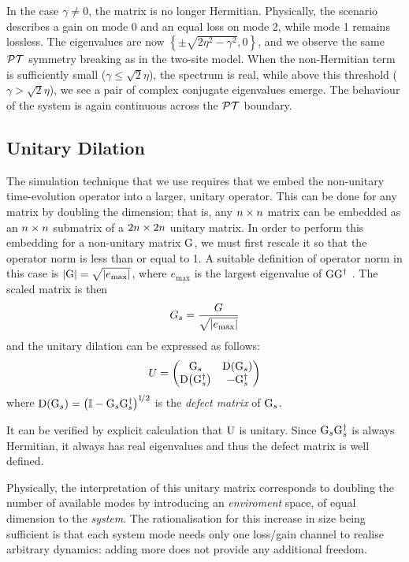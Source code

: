In the case \(\gamma \neq 0\), the matrix is no longer Hermitian. Physically,
the scenario describes a gain on mode 0 and an equal loss on mode 2, while
mode 1 remains lossless. The eigenvalues are now \(\left\{ \pm \sqrt{2 \eta^{2}
- \gamma^{2}}, 0 \right\}\), and we observe the same \(\mathcal{PT}\) symmetry breaking
as in the two-site model. When the non-Hermitian term is sufficiently small
(\(\gamma \leq \sqrt{2} \eta\)), the spectrum is real, while above this
threshold (\(\gamma > \sqrt{2} \eta\)), we see a pair of complex conjugate
eigenvalues emerge. The behaviour of the system is again continuous across the
\(\mathcal{PT}\) boundary.

\subsection{Unitary Dilation}
The simulation technique that we use requires that we embed the non-unitary
time-evolution operator into a larger, unitary operator. This can be done for
any matrix by doubling the dimension; that is, any \(n \times n\) matrix can be
embedded as an \(n \times n\) submatrix of a \(2n \times 2n\) unitary matrix. In order
to perform this embedding for a non-unitary matrix \(\mathrm{G}\), we must first
rescale it so that the operator norm is less than or equal to 1. A suitable
definition of operator norm in this case is \(\left|\mathrm{G}\right| = \sqrt{\left|e_{
\text{max}}\right|}\), where \(e_{\text{max}}\) is the largest eigenvalue of 
\(\mathrm{GG^{\dagger}}\) \cite{dilation}. The scaled matrix is then
\begin{equation}
  G_{s} = \frac{G}{\sqrt{\left|e_{\text{max}}\right|}}
\end{equation}
and the unitary dilation can be expressed as follows:
\begin{equation}
  U = \begin{pmatrix}
    \mathrm{G}_{s} & \mathrm{D}\!\left(\mathrm{G}_{s}\right) \\
    \mathrm{D}\!\left(\mathrm{G}_{s}^{\dagger}\right) & -\mathrm{G}_{s}^{\dagger} \end{pmatrix}
\end{equation}
where \(\mathrm{D}\!\left(\mathrm{G}_{s}\right) = \left( \mathbb{I} - \mathrm{G}_{s}\mathrm{G}_{s}^{
\dagger} \right)^{1\!/2}
\) is the \emph{defect matrix} of \(\mathrm{G}_{s}\).

It can be verified by explicit calculation that \(\mathrm{U}\) is unitary.
Since \(\mathrm{G}_{s}\mathrm{G}_{s}^{\dagger}\) is always Hermitian, it always has
real eigenvalues and thus the defect matrix is well defined.

Physically, the interpretation of this unitary matrix corresponds to doubling
the number of available modes by introducing an \emph{enviroment} space, of
equal dimension to the \emph{system}. The rationalisation for this increase in
size being sufficient is that each system mode needs only one loss/gain channel
to realise arbitrary dynamics: adding more does not provide any additional
freedom.

